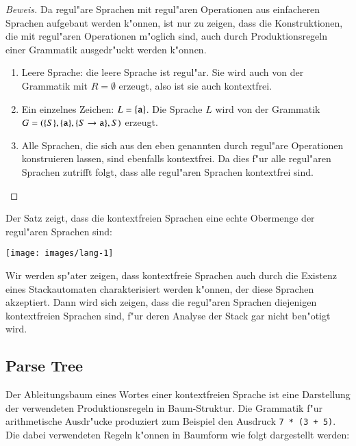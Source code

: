\begin{proof}[Beweis]
Da regul"are Sprachen mit regul"aren Operationen aus einfacheren
Sprachen aufgebaut werden k"onnen, ist nur zu zeigen, dass die
Konstruktionen, die mit regul"aren Operationen m"oglich sind,
auch durch Produktionsregeln einer Grammatik ausgedr"uckt werden
k"onnen. 
\begin{enumerate}
\item Leere Sprache: die leere Sprache ist regul"ar. Sie wird auch 
von der Grammatik mit $R=\emptyset$ erzeugt, also ist sie auch
kontextfrei.
\item Ein einzelnes Zeichen: $L=\{{\tt a}\}$. Die Sprache $L$ wird von
der Grammatik $G=(\{S\}, \{{\tt a}\}, \{S\to{\tt a}\}, S)$
erzeugt.
\item Alle Sprachen, die sich aus den eben genannten durch regul"are
Operationen konstruieren lassen, sind ebenfalls kontextfrei. Da
dies f"ur alle regul"aren Sprachen zutrifft folgt, dass alle
regul"aren Sprachen kontextfrei sind.
\end{enumerate}
\end{proof}

Der Satz zeigt, dass die kontextfreien Sprachen eine echte
Obermenge der regul"aren Sprachen sind:
\begin{center}
\texttt{[image: images/lang-1]}
\end{center}
Wir werden sp"ater zeigen, dass kontextfreie Sprachen auch durch
die Existenz eines Stackautomaten charakterisiert werden k"onnen,
der diese Sprachen akzeptiert. Dann wird sich zeigen, dass 
die regul"aren Sprachen diejenigen kontextfreien Sprachen sind,
f"ur deren Analyse der Stack gar nicht ben"otigt wird.

\subsection{Parse Tree}
Der Ableitungsbaum eines Wortes einer kontextfreien Sprache
ist eine Darstellung der verwendeten Produktionsregeln in Baum-Struktur.
Die Grammatik f"ur arithmetische Ausdr"ucke produziert zum Beispiel
den Ausdruck {\tt 7 * (3 + 5)}.
Die dabei verwendeten Regeln k"onnen in Baumform wie folgt
dargestellt werden:

